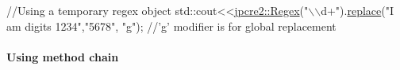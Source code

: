 \begin{DoxyCode}
\textcolor{comment}{//Using a temporary regex object}
std::cout<<\hyperlink{classjpcre2_1_1Regex}{jpcre2::Regex}(\textcolor{stringliteral}{"\(\backslash\)\(\backslash\)d+"}).\hyperlink{classjpcre2_1_1Regex_ac592ce7a5e4210ed5f90a0105b1f2981_ac592ce7a5e4210ed5f90a0105b1f2981}{replace}(\textcolor{stringliteral}{"I am digits 1234"},\textcolor{stringliteral}{"5678"}, \textcolor{stringliteral}{"g"});
\textcolor{comment}{//'g' modifier is for global replacement}
\end{DoxyCode}
\hypertarget{index_using-method-chaining}{}\paragraph{Using method chain}\label{index_using-method-chaining}

